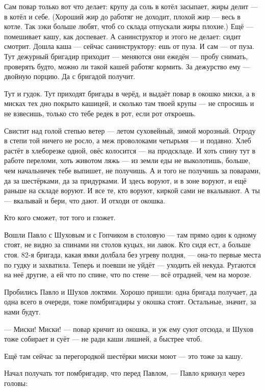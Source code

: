 Сам повар только вот что делает: крупу да соль в котёл засыпает, жиры делит --- в котёл и себе.
(Хороший жир до работяг не доходит, плохой жир --- весь в котле. Так зэки больше любят, чтоб со
склада отпускали жиры плохие.) Ещё --- помешивает кашу, как доспевает. А санинструктор и этого
не делает: сидит смотрит. Дошла каша --- сейчас санинструктору: ешь от пуза. И сам --- от пуза.
Тут дежурный бригадир приходит --- меняются они ежедён --- пробу снимать, проверять будто,
можно ли такой кашей работяг кормить. За дежурство ему --- двойную порцию. Да с бригадой
получит.

Тут и гудок. Тут приходят бригады в черёд, и выдаёт повар в окошко миски, а в мисках тех дно
покрыто кашицей, и сколько там твоей крупы --- не спросишь и не взвесишь, только сто тебе редек
в рот, если рот откроешь.

Свистит над голой степью ветер --- летом суховейный, зимой морозный. Отроду в степи той ничего
не росло, а меж проволоками четырьмя --- и подавно. Хлеб растёт в хлеборезке одной, овёс
колосится --- на продскладе. И хоть спину тут в работе переломи, хоть животом ляжь --- из земли
еды не выколотишь, больше, чем начальничек тебе выпишет, не получишь. А и того не получишь за
поварами, да за шестёрками, да за придурками. И здесь воруют, и в зоне воруют, и ещё раньше на
складе воруют. И все те, кто воруют, киркой сами не вкалывают. А ты --- вкалывай и бери, что дают.
И отходи от окошка.

Кто кого сможет, тот того и гложет.

Вошли Павло с Шуховым и с Гопчиком в столовую --- там прямо один к одному стоят, не видно за
спинами ни столов куцых, ни лавок. Кто сидя ест, а больше стоя. 82-я бригада, какая ямки долбала
без угреву полдня, --- она-то первые места по гудку и захватила. Теперь и поевши не уйдёт ---
уходить ей некуда. Ругаются на неё другие, а ей что по спине, что по стене --- всё отрадней, чем
на морозе.

Пробились Павло и Шухов локтями. Хорошо пришли: одна бригада получает, да одна всего в
очереди, тоже помбригадиры у окошка стоят. Остальные, значит, за нами будут.

--- Миски! Миски! --- повар кричит из окошка, и уж ему суют отсюда, и Шухов тоже собирает и суёт ---
не ради каши лишней, а быстрее чтоб.

Ещё там сейчас за перегородкой шестёрки миски моют --- это тоже за кашу.

Начал получать тот помбригадир, что перед Павлом, --- Павло крикнул через головы:

